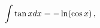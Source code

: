 \[\int\mathop{\tan\/}\nolimits xdx=-\mathop{\ln\/}\nolimits\!\left(\mathop{\cos%
\/}\nolimits x\right),\]